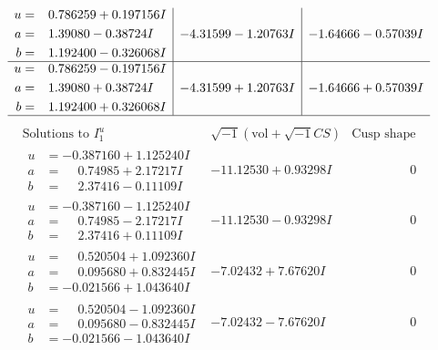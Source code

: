 \documentclass[1p]{elsarticle_modified}
\theoremstyle{definition}
\newcommand{\I}{\sqrt{-1}}
\begin{document}
$$\begin{array}{c|c|c}
\begin{aligned}
u &= \phantom{-}0.786259 + 0.197156 I \\
a &= \phantom{-}1.39080 - 0.38724 I \\
b &= \phantom{-}1.192400 - 0.326068 I\end{aligned}
 & -4.31599 - 1.20763 I & -1.64666 - 0.57039 I \\ \hline\begin{aligned}
u &= \phantom{-}0.786259 - 0.197156 I \\
a &= \phantom{-}1.39080 + 0.38724 I \\
b &= \phantom{-}1.192400 + 0.326068 I\end{aligned}
 & -4.31599 + 1.20763 I & -1.64666 + 0.57039 I\\
 \hline 
 \end{array}$$\newpage$$\begin{array}{c|c|c}  
\text{Solutions to }I^u_{1}& \I (\text{vol} + \sqrt{-1}CS) & \text{Cusp shape}\\
 \hline 
\begin{aligned}
u &= -0.387160 + 1.125240 I \\
a &= \phantom{-}0.74985 + 2.17217 I \\
b &= \phantom{-}2.37416 - 0.11109 I\end{aligned}
 & -11.12530 + 0.93298 I & \phantom{-0.000000 } 0 \\ \hline\begin{aligned}
u &= -0.387160 - 1.125240 I \\
a &= \phantom{-}0.74985 - 2.17217 I \\
b &= \phantom{-}2.37416 + 0.11109 I\end{aligned}
 & -11.12530 - 0.93298 I & \phantom{-0.000000 } 0 \\ \hline\begin{aligned}
u &= \phantom{-}0.520504 + 1.092360 I \\
a &= \phantom{-}0.095680 + 0.832445 I \\
b &= -0.021566 + 1.043640 I\end{aligned}
 & -7.02432 + 7.67620 I & \phantom{-0.000000 } 0 \\ \hline\begin{aligned}
u &= \phantom{-}0.520504 - 1.092360 I \\
a &= \phantom{-}0.095680 - 0.832445 I \\
b &= -0.021566 - 1.043640 I\end{aligned}
 & -7.02432 - 7.67620 I & \phantom{-0.000000 } 0 \\ \hline\begin{aligned}

\end{aligned}
\end{array}$$
\end{document}
